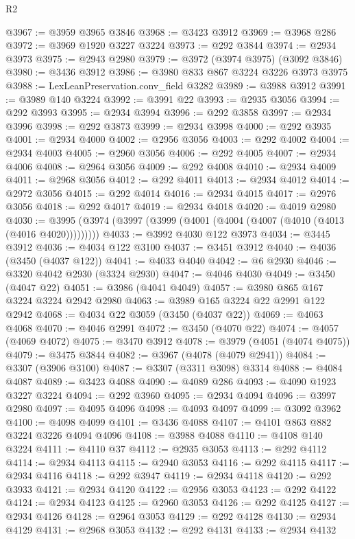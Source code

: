 \begin{lexlean}{R2}
\begin{coremodule}
@3967 := @3959 @3965 @3846
@3968 := @3423 @3912
@3969 := @3968 @286
@3972 := @3969 @1920 @3227 @3224
@3973 := @292 @3844
@3974 := @2934 @3973
@3975 := @2943 @2980
@3979 := @3972 (@3974 @3975) (@3092 @3846)
@3980 := @3436 @3912
@3986 := @3980 @833 @867 @3224 @3226 @3973 @3975
@3988 := LexLeanPreservation.conv_field @3282
@3989 := @3988 @3912
@3991 := @3989 @140 @3224
@3992 := @3991 @22
@3993 := @2935 @3056
@3994 := @292 @3993
@3995 := @2934 @3994
@3996 := @292 @3858
@3997 := @2934 @3996
@3998 := @292 @3873
@3999 := @2934 @3998
@4000 := @292 @3935
@4001 := @2934 @4000
@4002 := @2956 @3056
@4003 := @292 @4002
@4004 := @2934 @4003
@4005 := @2960 @3056
@4006 := @292 @4005
@4007 := @2934 @4006
@4008 := @2964 @3056
@4009 := @292 @4008
@4010 := @2934 @4009
@4011 := @2968 @3056
@4012 := @292 @4011
@4013 := @2934 @4012
@4014 := @2972 @3056
@4015 := @292 @4014
@4016 := @2934 @4015
@4017 := @2976 @3056
@4018 := @292 @4017
@4019 := @2934 @4018
@4020 := @4019 @2980
@4030 := @3995 (@3974 (@3997 (@3999 (@4001 (@4004 (@4007 (@4010 (@4013 (@4016 @4020)))))))))
@4033 := @3992 @4030 @122 @3973
@4034 := @3445 @3912
@4036 := @4034 @122 @3100
@4037 := @3451 @3912
@4040 := @4036 (@3450 (@4037 @122))
@4041 := @4033 @4040
@4042 := @6 @2930
@4046 := @3320 @4042 @2930 (@3324 @2930)
@4047 := @4046 @4030
@4049 := @3450 (@4047 @22)
@4051 := @3986 (@4041 @4049)
@4057 := @3980 @865 @167 @3224 @3224 @2942 @2980
@4063 := @3989 @165 @3224 @22 @2991 @122 @2942
@4068 := @4034 @22 @3059 (@3450 (@4037 @22))
@4069 := @4063 @4068
@4070 := @4046 @2991
@4072 := @3450 (@4070 @22)
@4074 := @4057 (@4069 @4072)
@4075 := @3470 @3912
@4078 := @3979 (@4051 (@4074 @4075))
@4079 := @3475 @3844
@4082 := @3967 (@4078 (@4079 @2941))
@4084 := @3307 (@3906 @3100)
@4087 := @3307 (@3311 @3098) @3314
@4088 := @4084 @4087
@4089 := @3423 @4088
@4090 := @4089 @286
@4093 := @4090 @1923 @3227 @3224
@4094 := @292 @3960
@4095 := @2934 @4094
@4096 := @3997 @2980
@4097 := @4095 @4096
@4098 := @4093 @4097
@4099 := @3092 @3962
@4100 := @4098 @4099
@4101 := @3436 @4088
@4107 := @4101 @863 @882 @3224 @3226 @4094 @4096
@4108 := @3988 @4088
@4110 := @4108 @140 @3224
@4111 := @4110 @37
@4112 := @2935 @3053
@4113 := @292 @4112
@4114 := @2934 @4113
@4115 := @2940 @3053
@4116 := @292 @4115
@4117 := @2934 @4116
@4118 := @292 @3947
@4119 := @2934 @4118
@4120 := @292 @3933
@4121 := @2934 @4120
@4122 := @2956 @3053
@4123 := @292 @4122
@4124 := @2934 @4123
@4125 := @2960 @3053
@4126 := @292 @4125
@4127 := @2934 @4126
@4128 := @2964 @3053
@4129 := @292 @4128
@4130 := @2934 @4129
@4131 := @2968 @3053
@4132 := @292 @4131
@4133 := @2934 @4132

\end{coremodule}
\end{lexlean}

